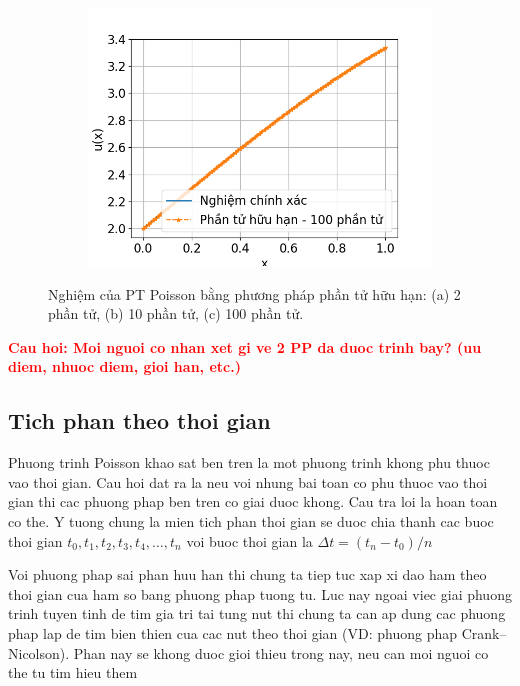 \begin{figure}[htbp]
\begin{subfigure}[b]{0.3\linewidth}
        \caption{}
        \label{fig:PTHH_10el}
    \end{subfigure}\hfill
    \begin{subfigure}[b]{0.3\linewidth}
        \centering
        \includegraphics[width=\linewidth]{Tuan6/figure/PTHH_100el.png}
        \caption{}
        \label{fig:PTHH_100el}
    \end{subfigure}
    \caption{Nghiệm của PT Poisson bằng phương pháp phần tử hữu hạn: (a) 2 phần tử, (b) 10 phần tử, (c) 100 phần tử.}
    \label{fig_PTHHresults}
\end{figure}
\textbf{\textcolor{red}{Cau hoi: Moi nguoi co nhan xet gi ve 2 PP da duoc trinh bay? (uu diem, nhuoc diem, gioi han, etc.)}}

\subsection{Tich phan theo thoi gian}

Phuong trinh Poisson khao sat ben tren la mot phuong trinh khong phu thuoc vao thoi gian. Cau hoi dat ra la neu voi nhung bai toan co phu thuoc vao thoi gian thi cac phuong phap ben tren co giai duoc khong. Cau tra loi la hoan toan co the. Y tuong chung la mien tich phan thoi gian se duoc chia thanh cac buoc thoi gian $t_0, t_1, t_2, t_3, t_4, \dots, t_n$ voi buoc thoi gian la $\Delta t = (t_n-t_0)/n$

Voi phuong phap sai phan huu han thi chung ta tiep tuc xap xi dao ham theo thoi gian cua ham so bang phuong phap tuong tu. Luc nay ngoai viec giai phuong trinh tuyen tinh de tim gia tri tai tung nut thi chung ta can ap dung cac phuong phap lap de tim bien thien cua cac nut theo thoi gian (VD: phuong phap Crank–Nicolson). Phan nay se khong duoc gioi thieu trong nay, neu can moi nguoi co the tu tim hieu them

